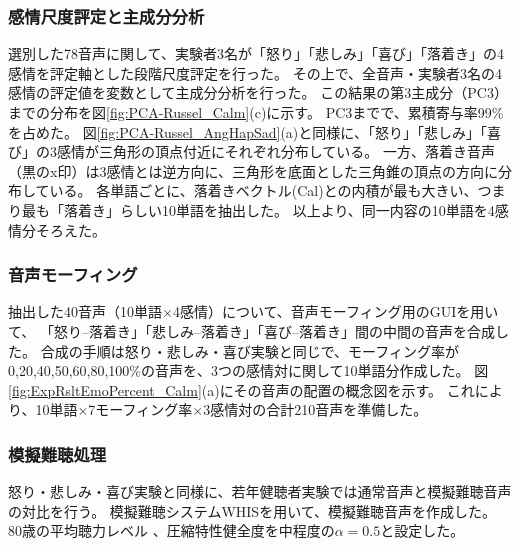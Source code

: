 

\subsubsection{感情尺度評定と主成分分析}
\label{sec:5Scale_Calm}
選別した78音声に関して、実験者3名が「怒り」「悲しみ」「喜び」「落着き」の4感情を評定軸とした段階尺度評定を行った。
その上で、全音声・実験者3名の4感情の評定値を変数として主成分分析を行った。
この結果の第3主成分（PC3）までの分布を図\ref{fig:PCA-Russel_Calm}(c)に示す。
PC3までで、累積寄与率99\%を占めた。
図\ref{fig:PCA-Russel_AngHapSad}(a)と同様に、「怒り」「悲しみ」「喜び」の3感情が三角形の頂点付近にそれぞれ分布している。
一方、落着き音声（黒のx印）は3感情とは逆方向に、三角形を底面とした三角錐の頂点の方向に分布している。
各単語ごとに、落着きベクトル(Cal)との内積が最も大きい、つまり最も「落着き」らしい10単語を抽出した。
以上より、同一内容の10単語を4感情分そろえた。





\subsubsection{音声モーフィング}
\label{sec:morphCalm}

抽出した40音声（10単語$\times$4感情）について、音声モーフィング用のGUI\cite{kawahara2024interactive}を用いて、
「怒り--落着き」「悲しみ--落着き」「喜び--落着き」間の中間の音声を合成した。
合成の手順は怒り・悲しみ・喜び実験と同じで、モーフィング率が0,20,40,50,60,80,100\%の音声を、3つの感情対に関して10単語分作成した。 
図\ref{fig:ExpRsltEmoPercent_Calm}(a)にその音声の配置の概念図を示す。
これにより、10単語$\times$7モーフィング率$\times$3感情対の合計210音声を準備した。

\subsubsection{模擬難聴処理}

怒り・悲しみ・喜び実験と同様に、若年健聴者実験では通常音声と模擬難聴音声の対比を行う。
模擬難聴システムWHIS\cite{irino2023hearing}を用いて、模擬難聴音声を作成した。
80歳の平均聴力レベル \cite{tsuiki2002nihon_Jpn}、圧縮特性健全度を中程度の$\alpha=0.5$と設定した。


\newpage
